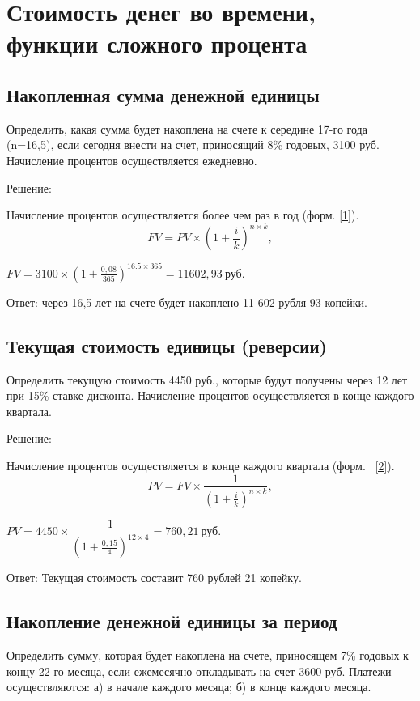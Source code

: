 \section{Стоимость денег во времени, функции сложного процента}
\subsection{Накопленная сумма денежной единицы}

Определить, какая сумма будет накоплена на счете к середине 17-го года (n=16,5), если сегодня внести на счет, приносящий 8\% годовых, 3100 руб. Начисление процентов осуществляется ежедневно.

Решение:

Начисление процентов осуществляется более чем раз в год (форм. \ref{1}).
\begin{equation}\label{1}
FV = PV \times(1+\frac{i}{k})^{n \times k},
\end{equation}

$ FV = 3100 \times (1+\frac{0,08}{365})^{16.5 \times 365} =11602,93\  \text{руб.} $

Ответ: через 16,5 лет на счете будет накоплено 11 602 рубля 93 копейки.

\subsection{Текущая стоимость единицы (реверсии)}

Определить текущую стоимость 4450 руб., которые будут получены через 12 лет при 15\% ставке дисконта. Начисление процентов осуществляется в конце каждого квартала.

Решение:

Начисление процентов осуществляется в конце каждого квартала (форм.~ \ref{2}).
\begin{equation}\label{2}
PV = FV \times \dfrac{1}{(1+\frac{i}{k})^{n \times k}},
\end{equation}

$ PV = 4450 \times \dfrac{1}{(1+\frac{0,15}{4})^{12 \times 4}} = 760,21\  \text{руб.}   $
	
Ответ: Текущая стоимость составит 760 рублей 21 копейку.

\subsection{Накопление денежной единицы за период}

Определить сумму, которая будет накоплена на счете, приносящем 7\% годовых к концу 22-го месяца, если ежемесячно откладывать на счет 3600 руб. Платежи осуществляются: а) в начале каждого месяца; б) в конце каждого месяца.

